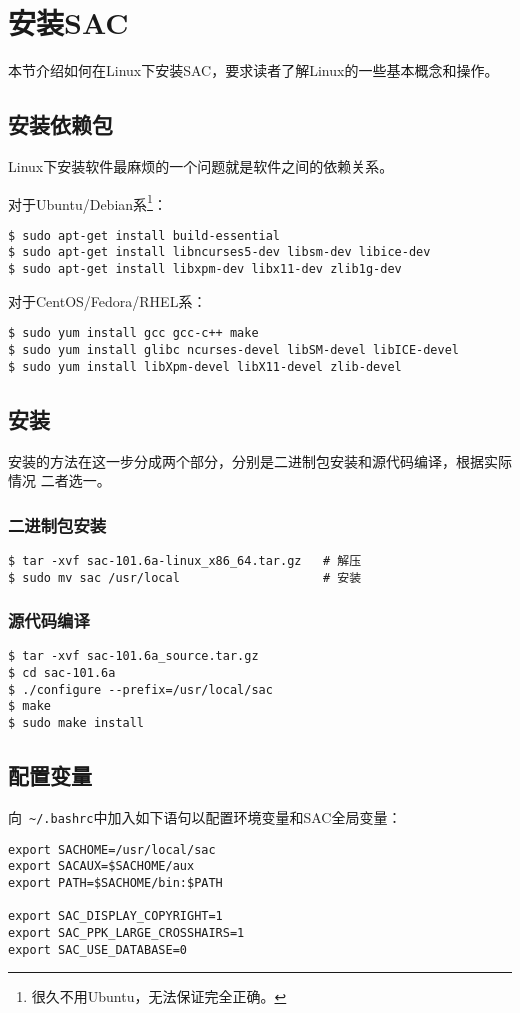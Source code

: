 \section{安装SAC}
\label{sec:sac-install}
本节介绍如何在Linux下安装SAC，要求读者了解Linux的一些基本概念和操作。

\subsection*{安装依赖包}
Linux下安装软件最麻烦的一个问题就是软件之间的依赖关系。

对于Ubuntu/Debian系\footnote{很久不用Ubuntu，无法保证完全正确。}：
\begin{verbatim}
$ sudo apt-get install build-essential
$ sudo apt-get install libncurses5-dev libsm-dev libice-dev
$ sudo apt-get install libxpm-dev libx11-dev zlib1g-dev
\end{verbatim}

对于CentOS/Fedora/RHEL系：
\begin{verbatim}
$ sudo yum install gcc gcc-c++ make
$ sudo yum install glibc ncurses-devel libSM-devel libICE-devel
$ sudo yum install libXpm-devel libX11-devel zlib-devel
\end{verbatim}

\subsection*{安装}
安装的方法在这一步分成两个部分，分别是二进制包安装和源代码编译，根据实际情况
二者选一。
\subsubsection*{二进制包安装}
\begin{verbatim}
$ tar -xvf sac-101.6a-linux_x86_64.tar.gz   # 解压
$ sudo mv sac /usr/local                    # 安装
\end{verbatim}

\subsubsection*{源代码编译}
\begin{verbatim}
$ tar -xvf sac-101.6a_source.tar.gz
$ cd sac-101.6a
$ ./configure --prefix=/usr/local/sac
$ make
$ sudo make install
\end{verbatim}

\subsection*{配置变量}
向~\verb+~/.bashrc+中加入如下语句以配置环境变量和SAC全局变量：
\begin{verbatim}
export SACHOME=/usr/local/sac
export SACAUX=$SACHOME/aux
export PATH=$SACHOME/bin:$PATH

export SAC_DISPLAY_COPYRIGHT=1
export SAC_PPK_LARGE_CROSSHAIRS=1
export SAC_USE_DATABASE=0
\end{verbatim}

